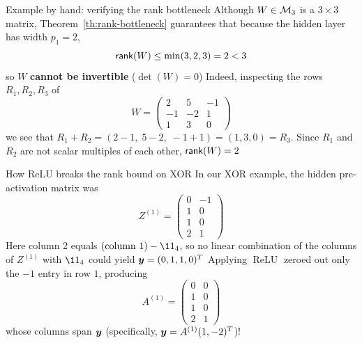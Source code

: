 \documentclass[aspectratio=169]{beamer}\usepackage[]{graphicx}\usepackage[]{xcolor}
\begin{document}
\begin{frame}{Example by hand: verifying the rank bottleneck}
Although $W \in \mathcal{M}_3$ is a $3 \times 3$ matrix, Theorem~\ref{th:rank-bottleneck} guarantees that because the hidden layer has width $p_1 = 2$,
\[
\mathsf{rank}(W) \le \min(3, 2, 3) = 2 < 3
\]
so $W$ \textbf{cannot be invertible} ($\det(W) = 0$)
\vfill
Indeed, inspecting the rows $R_1, R_2, R_3$ of
\[
W = \begin{pmatrix} 2 & 5 & -1 \\ -1 & -2 & 1 \\ 1 & 3 & 0 \end{pmatrix}
\]
we see that $R_1 + R_2 = (2 - 1, \; 5 - 2, \; -1 + 1) = (1, 3, 0) = R_3$.
Since $R_1$ and $R_2$ are not scalar multiples of each other, $\mathsf{rank}(W) = 2$
\end{frame}


\begin{frame}{How ReLU breaks the rank bound on XOR}
In our XOR example, the hidden pre-activation matrix was
\[
Z^{(1)} = \begin{pmatrix} 0 & -1 \\ 1 & 0 \\ 1 & 0 \\ 2 & 1 \end{pmatrix}
\]
Here column $2$ equals $(\text{column } 1) - \11_4$, so no linear combination of the columns of $Z^{(1)}$ with $\11_4$ could yield $\bm{y} = (0, 1, 1, 0)^T$
\vfill
Applying $\operatorname{ReLU}$ zeroed out only the $-1$ entry in row $1$, producing
\[
A^{(1)} = \begin{pmatrix} 0 & 0 \\ 1 & 0 \\ 1 & 0 \\ 2 & 1 \end{pmatrix}
\]
whose columns span $\bm{y}$ (specifically, $\bm{y} = A^{(1)}(1, -2)^T$)!
\end{frame}


\end{document}
